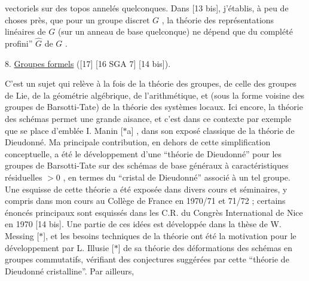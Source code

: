 
vectoriels sur des topos annelés quelconques. Dans
[13 bis], j'établis, à peu de choses près, que pour un
groupe discret $G$ , la théorie des représentations
linéaires de $G$ (sur un anneau de base quelconque)
ne dépend que du complété profini'' $\hat{G}$ de $G$ .

8. \uline{Groupes formels} ([17] [16 SGA 7] [14 bis]).

C'est un sujet qui relève à la fois de la
théorie des groupes, de celle des groupes de Lie, de
la géométrie algébrique, de l'arithmétique, et (sous
la forme voisine des groupes de Barsotti-Tate) de la
théorie des systèmes locaux. Ici encore, la théorie
des schémas permet une grande aisance, et c'est dans
ce contexte par exemple que se place d'emblée I. Manin
[$*$a] , dans son exposé classique de la théorie de
Dieudonné. Ma principale contribution, en dehors de
cette simplification conceptuelle, a été le développement
d'une ``théorie de Dieudonné'' pour les groupes de
Barsotti-Tate sur des schémas de base généraux à
caractéristiques résiduelles $> 0$ , en termes du
``cristal de Dieudonné'' associé à un tel groupe. Une
esquisse de cette théorie a été exposée dans divers
cours et séminaires, y compris dans mon cours au
Collège de France en 1970/71 et 71/72 ; certains énoncés
principaux sont esquissés dans les C.R. du Congrès
International de Nice en 1970 [14 bis]. Une partie
de ces idées est développée dans la thèse de W. Messing
[$*$], et les besoins techniques de la théorie ont été
la motivation pour le développement par L. Illusie [$*$]
de sa théorie des déformations des schémas en groupes
commutatifs, vérifiant des conjectures suggérées par
cette ``théorie de Dieudonné cristalline''. Par ailleurs,

